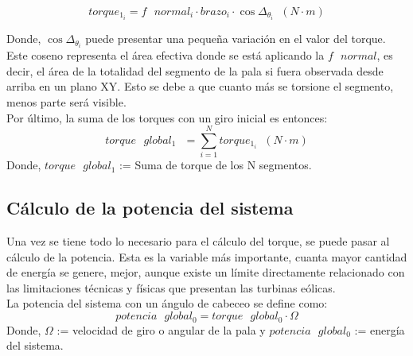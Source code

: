   \begin{equation}
  torque_{1_i} = f \text{ } normal_i \cdot brazo_i \cdot \cos{\Delta_{\theta_{i}}} \hspace{7pt} (N \cdot m)
 \label{def:torque_algebraico_torsion}
 \end{equation}
 
Donde, $ \cos{\Delta_{\theta_{i}}} $ puede presentar una pequeña variación en el valor del torque. Este coseno representa el área efectiva donde se está aplicando la $ f \text{ } normal $, es decir, el área de la totalidad del segmento de la pala si fuera observada desde arriba en un plano XY. Esto se debe a que cuanto más se torsione el segmento, menos parte será visible.\\

Por último, la suma de los torques con un giro inicial es entonces:
\begin{equation}
  torque \text{ } global_1 \text{ } = \sum_{i=1}^{N} torque_{1_i} \hspace{7pt} (N \cdot m)
 \label{def:torque_global_1}
\end{equation}
Donde, $torque \text{ } global_1$ := Suma de torque de los N segmentos.





















\subsection{Cálculo de la potencia del sistema}
\label{section:pot_sistema}
 
 Una vez se tiene todo lo necesario para el cálculo del torque, se puede pasar al cálculo de la potencia. Esta es la variable más importante, cuanta mayor cantidad de energía se genere, mejor, aunque existe un límite directamente relacionado con las limitaciones técnicas y físicas que presentan las turbinas eólicas. \\
 
 
  La potencia del sistema con un ángulo de cabeceo se define como:
  \begin{equation}
  potencia \text{ } global_0 = torque \text{ } global_0 \cdot \Omega  
 \label{def:potencia_giro_inicial}
 \end{equation}
  Donde, $\Omega$ := velocidad de giro o angular de la pala y $potencia \text{ } global_0$ := energía del sistema.\\
 
